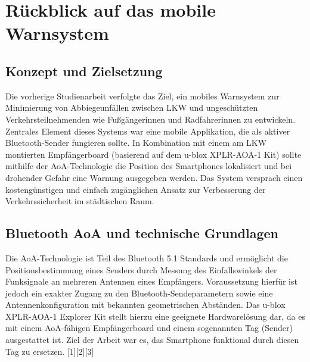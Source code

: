 \documentclass[a4paper, 12pt]{article} %
\begin{document}
\clearpage

\section{Rückblick auf das mobile Warnsystem}
\subsection{Konzept und Zielsetzung}
Die vorherige Studienarbeit verfolgte das Ziel, ein mobiles Warnsystem zur Minimierung von 
Abbiegeunfällen zwischen \ac{LKW} und ungeschützten Verkehrsteilnehmenden wie Fußgängerinnen und Radfahrerinnen zu entwickeln.
Zentrales Element dieses Systems war eine mobile Applikation, die als aktiver Bluetooth-Sender fungieren sollte. In Kombination 
mit einem am \ac{LKW} montierten Empfängerboard (basierend auf dem u-blox XPLR-AOA-1 Kit) sollte mithilfe der \acf{AoA}-Technologie 
die Position des Smartphones lokalisiert und bei drohender Gefahr eine Warnung ausgegeben werden. Das System versprach einen 
kostengünstigen und einfach zugänglichen Ansatz zur Verbesserung der Verkehrssicherheit im städtischen Raum.

\subsection{Bluetooth AoA und technische Grundlagen}
Die \ac{AoA}-Technologie ist Teil des Bluetooth 5.1 Standards und ermöglicht die Positionsbestimmung
 eines Senders durch Messung des Einfallswinkels der Funksignale an mehreren Antennen eines Empfängers. 
 Voraussetzung hierfür ist jedoch ein exakter Zugang zu den Bluetooth-Sendeparametern sowie eine Antennenkonfiguration 
 mit bekannten geometrischen Abständen. Das u-blox XPLR-AOA-1 Explorer Kit stellt hierzu eine geeignete Hardwarelösung dar, 
 da es mit einem \ac{AoA}-fähigen Empfängerboard und einem sogenannten Tag (Sender) ausgestattet ist. Ziel der Arbeit war es, das Smartphone 
 funktional durch diesen Tag zu ersetzen. [1][2][3]
\end{document}
